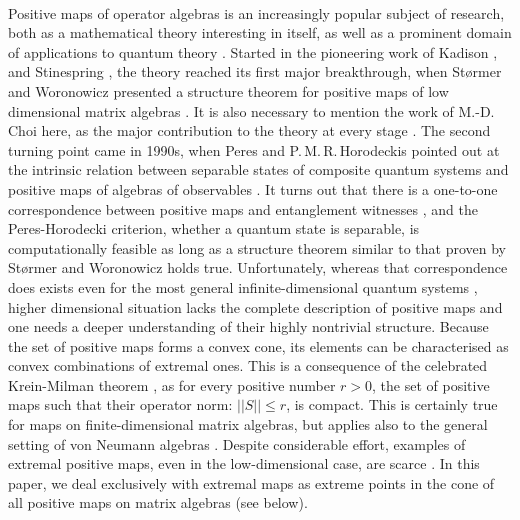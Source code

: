 \documentclass[12pt]{article}
\theoremstyle{plain}
\theoremstyle{definition}
\theoremstyle{remark}
\numberwithin{equation}{section}
\begin{document}
\paragraph{}
Positive maps of operator algebras is an increasingly
popular subject of research,
both as a mathematical theory interesting in itself,
as well as a prominent domain of applications to quantum theory
\cite{stormer2013positive}.
Started in the pioneering work of Kadison
\cite{kadison1952generalized},
and Stinespring
\cite{stinespring1955positive},
the theory reached its first major breakthrough,
when St{\o}rmer and Woronowicz presented a structure theorem
for positive maps of low dimensional matrix algebras
\cite{stormer1963positive,woronowicz1976positive}.
It is also necessary to mention the work of \mbox{M.-D.\,Choi} here,
as the major contribution to the theory at every stage
\mbox{\cite{choi1975completely,choi1980some,choi1977extremal}}.
The second turning point came in 1990s,
when Peres and P.\,M.\,R.\,Horodeckis pointed out at the intrinsic relation
between separable states of composite quantum systems
and positive maps of algebras of observables
\cite{peres1996separability,horodecki1996separability}.
It turns out that there is a one-to-one correspondence between
positive maps and entanglement witnesses
\cite{chruscinski2014entanglement},
and the Peres-Horodecki criterion,
whether a quantum state is separable,
is computationally feasible as long as a structure theorem
similar to that proven by St{\o}rmer and Woronowicz holds true.
Unfortunately,
whereas that correspondence does exists even for
the most general infinite-dimensional quantum systems
\mbox{\cite{stormer2009separable,miller2014horodeckis}},
higher dimensional situation lacks
the complete description of positive maps
and one needs a deeper understanding of their highly nontrivial structure.
Because the set of positive maps forms a convex cone,
its elements can be characterised as convex combinations of extremal ones.
This is a consequence of the celebrated Krein-Milman theorem
\cite{krein1940extreme}, as for every positive number $r > 0$,
the set of positive maps such that their operator norm: $||S|| \leq r$,
is compact.
This is certainly true for maps on finite-dimensional matrix algebras,
but applies also to the general setting of von Neumann algebras \cite{miller2014horodeckis}.
Despite considerable effort,
examples of extremal positive maps,
even in the low-dimensional case,
are scarce
\cite{choi1977extremal,osaka1992class,ha2011entanglement,chruscinski2011exposed}.
In this paper, we deal exclusively with extremal maps as extreme points in
the cone of all positive maps on matrix algebras (see below).
\end{document}
